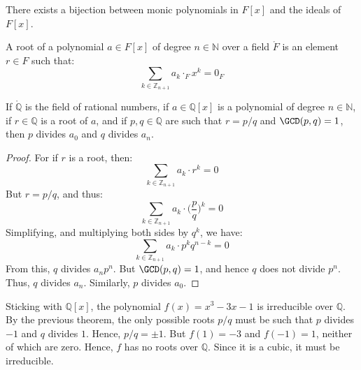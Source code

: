     \begin{theorem}
        There exists a bijection between monic polynomials in $F[x]$ and
        the ideals of $F[x]$.
    \end{theorem}
    \begin{definition}
        A root of a polynomial $a\in{F}[x]$ of degree $n\in\mathbb{N}$ over
        a field $\ring{F}$ is an element $r\in{F}$ such that:
        \begin{equation}
            \sum_{k\in\mathbb{Z}_{n+1}}a_{k}\cdot_{F}x^{k}=0_{F}
        \end{equation}
    \end{definition}
    \begin{theorem}
        If $\ring{\mathbb{Q}}$ is the field of rational numbers, if
        $a\in\mathbb{Q}[x]$ is a polynomial of degree $n\in\mathbb{N}$,
        if $r\in\mathbb{Q}$ is a root of $a$, and if $p,q\in\mathbb{Q}$
        are such that $r=p/q$ and $\GCD(p,q)=1$, then $p$ divides $a_{0}$
        and $q$ divides $a_{n}$.
    \end{theorem}
    \begin{proof}
        For if $r$ is a root, then:
        \begin{equation}
            \sum_{k\in\mathbb{Z}_{n+1}}a_{k}\cdot{r}^{k}=0
        \end{equation}
        But $r=p/q$, and thus:
        \begin{equation}
            \sum_{k\in\mathbb{Z}_{n+1}}a_{k}\cdot\big(\frac{p}{q}\big)^{k}
            =0
        \end{equation}
        Simplifying, and multiplying both sides by $q^{k}$, we have:
        \begin{equation}
            \sum_{k\in\mathbb{Z}_{n+1}}a_{k}\cdot{p}^{k}q^{n-k}=0
        \end{equation}
        From this, $q$ divides $a_{n}p^{n}$. But $\GCD(p,q)=1$, and hence
        $q$ does not divide $p^{n}$. Thus, $q$ divides $a_{n}$. Similarly,
        $p$ divides $a_{0}$.
    \end{proof}
    \begin{example}
        Sticking with $\mathbb{Q}[x]$, the polynomial $f(x)=x^{3}-3x-1$ is
        irreducible over $\mathbb{Q}$. By the previous theorem, the only
        possible roots $p/q$ must be such that $p$ divides $\minus{1}$ and
        $q$ divides $1$. Hence, $p/q=\pm{1}$. But $f(1)=\minus{3}$ and
        $f(\minus{1})=1$, neither of which are zero. Hence, $f$ has no roots
        over $\mathbb{Q}$. Since it is a cubic, it must be irreducible.
    \end{example}
